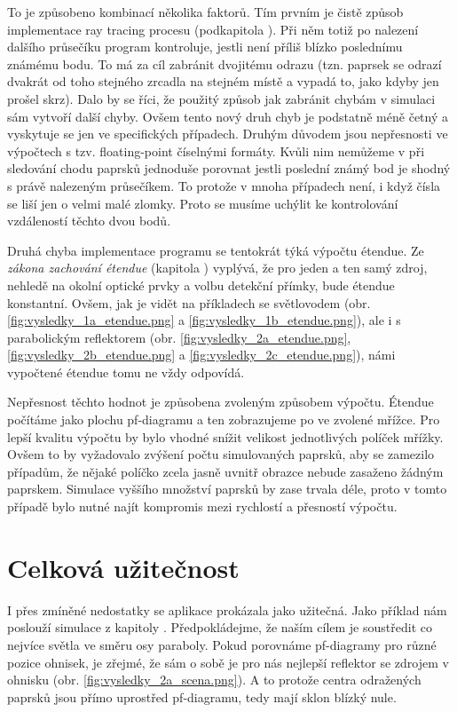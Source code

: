 To je způsobeno kombinací několika faktorů. Tím prvním je čistě způsob implementace ray tracing procesu (podkapitola ). Při něm totiž po nalezení dalšího průsečíku program kontroluje, jestli není příliš blízko poslednímu známému bodu. To má za cíl zabránit dvojitému odrazu (tzn. paprsek se odrazí dvakrát od toho stejného zrcadla na stejném místě a vypadá to, jako kdyby jen prošel skrz). Dalo by se říci, že použitý způsob jak zabránit chybám v simulaci sám vytvoří další chyby. Ovšem tento nový druh chyb je podstatně méně četný a vyskytuje se jen ve specifických případech. Druhým důvodem jsou nepřesnosti ve výpočtech s tzv. floating-point číselnými formáty. \parencite{ieee2008floating} Kvůli nim nemůžeme v při sledování chodu paprsků jednoduše porovnat jestli poslední známý bod je shodný s právě nalezeným průsečíkem. To protože v mnoha případech není, i když čísla se liší jen o velmi malé zlomky. Proto se musíme uchýlit ke kontrolování vzdáleností těchto dvou bodů.

Druhá chyba implementace programu se tentokrát týká výpočtu étendue. Ze \emph{zákona zachování étendue} (kapitola ) vyplývá, že pro jeden a ten samý zdroj, nehledě na okolní optické prvky a volbu detekční přímky, bude étendue konstantní. Ovšem, jak je vidět na příkladech se světlovodem (obr. \ref{fig:vysledky_1a_etendue.png} a \ref{fig:vysledky_1b_etendue.png}), ale i s parabolickým reflektorem (obr. \ref{fig:vysledky_2a_etendue.png}, \ref{fig:vysledky_2b_etendue.png} a \ref{fig:vysledky_2c_etendue.png}), námi vypočtené étendue tomu ne vždy odpovídá.

Nepřesnost těchto hodnot je způsobena zvoleným způsobem výpočtu. Étendue počítáme jako plochu pf-diagramu a ten zobrazujeme po ve zvolené mřížce. Pro lepší kvalitu výpočtu by bylo vhodné snížit velikost jednotlivých políček mřížky. Ovšem to by vyžadovalo zvýšení počtu simulovaných paprsků, aby se zamezilo případům, že nějaké políčko zcela jasně uvnitř obrazce nebude zasaženo žádným paprskem. Simulace vyššího množství paprsků by zase trvala déle, proto v tomto případě bylo nutné najít kompromis mezi rychlostí a přesností výpočtu.


\section{Celková užitečnost}

I přes zmíněné nedostatky se aplikace prokázala jako užitečná. Jako příklad nám poslouží simulace z kapitoly . Předpokládejme, že naším cílem je soustředit co nejvíce světla ve směru osy paraboly. Pokud porovnáme pf-diagramy pro různé pozice ohnisek, je zřejmé, že sám o sobě je pro nás nejlepší reflektor se zdrojem v ohnisku (obr. \ref{fig:vysledky_2a_scena.png}). A to protože centra odražených paprsků jsou přímo uprostřed pf-diagramu, tedy mají sklon blízký nule.

